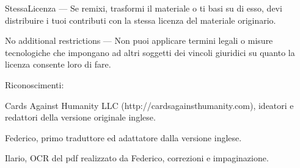 \documentclass[a4paper,12pt]{article}
\begin{document}
    StessaLicenza — Se remixi, trasformi il materiale o ti basi su di esso, devi distribuire i tuoi contributi con la stessa licenza del materiale originario.
\indent

    No additional restrictions — Non puoi applicare termini legali o misure tecnologiche che impongano ad altri soggetti dei vincoli giuridici su quanto la licenza consente loro di fare.

\bigskip
\noindent
Riconoscimenti:
\indent

Cards Against Humanity LLC (http://cardsagainsthumanity.com), ideatori e redattori della versione originale inglese.

Federico, primo traduttore ed adattatore dalla versione inglese.

Ilario, OCR del pdf realizzato da Federico, correzioni e impaginazione.
\end{document}
